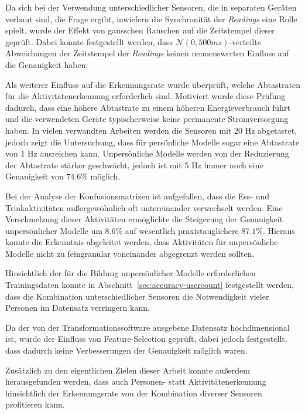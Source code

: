 Da sich bei der Verwendung unterschiedlicher Sensoren, die in separaten Geräten verbaut sind, die Frage ergibt, inwiefern die Synchronität der \textit{Readings} eine Rolle spielt, wurde der Effekt von gausschen Rauschen auf die Zeitstempel dieser geprüft. Dabei konnte festgestellt werden, dass $\mathcal{N}(0, 500ms)$-verteilte Abweichungen der Zeitstempel der \textit{Readings} keinen nennenswerten Einfluss auf die Genauigkeit haben.

Als weiterer Einfluss auf die Erkennungsrate wurde überprüft, welche Abtastraten für die Aktivitätenerkennung erforderlich sind. Motiviert wurde diese Prüfung dadurch, dass eine höhere Abtastrate zu einem höheren Energieverbrauch führt und die verwendeten Geräte typischerweise keine permanente Stromversorgung haben. In vielen verwandten Arbeiten werden die Sensoren mit 20 Hz abgetastet, jedoch zeigt die Untersuchung, dass für persönliche Modelle sogar eine Abtastrate von 1 Hz ausreichen kann. Unpersönliche Modelle werden von der Reduzierung der Abtastrate stärker geschwächt, jedoch ist mit 5 Hz immer noch eine Genauigkeit von $74.6 \%$ möglich.

Bei der Analyse der Konfusionsmatrizen ist aufgefallen, dass die Ess- und Trinkaktivitäten außergewöhnlich oft untereinander verwechselt werden. Eine Verschmelzung dieser Aktivitäten ermöglichte die Steigerung der Genauigkeit unpersönlicher Modelle um $8.6 \%$ auf wesentlich praxistauglichere $87.1 \%$. Hieraus konnte die Erkenntnis abgeleitet werden, dass Aktivitäten für unpersönliche Modelle nicht zu feingranular voneinander abgegrenzt werden sollten.

Hinsichtlich der für die Bildung unpersönlicher Modelle erforderlichen Trainingsdaten konnte in Abschnitt~\ref{sec:accuracy-usercount} festgestellt werden, dass die Kombination unterschiedlicher Sensoren die Notwendigkeit vieler Personen im Datensatz verringern kann. 

Da der von der Transformationssoftware ausgebene Datensatz hochdimensional ist, wurde der Einfluss von Feature-Selection geprüft, dabei jedoch festgestellt, dass dadurch keine Verbesserungen der Genauigkeit möglich waren.

Zusätzlich zu den eigentlichen Zielen dieser Arbeit konnte außerdem herausgefunden werden, dass auch Personen- statt Aktivitätenerkennung hinsichtlich der Erkennungsrate von der Kombination diverser Sensoren profitieren kann.

